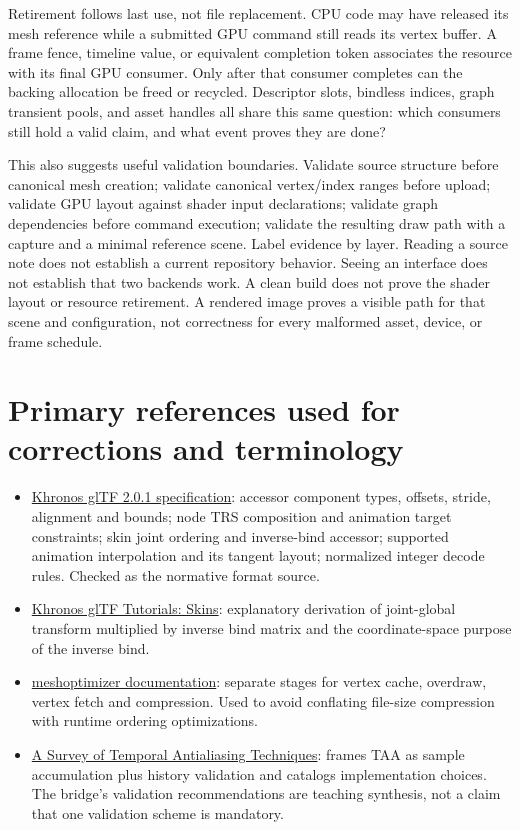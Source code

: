 Retirement follows last use, not file replacement. CPU code may have released its mesh reference while a submitted GPU command still reads its vertex buffer. A frame fence, timeline value, or equivalent completion token associates the resource with its final GPU consumer. Only after that consumer completes can the backing allocation be freed or recycled. Descriptor slots, bindless indices, graph transient pools, and asset handles all share this same question: which consumers still hold a valid claim, and what event proves they are done?

This also suggests useful validation boundaries. Validate source structure before canonical mesh creation; validate canonical vertex/index ranges before upload; validate GPU layout against shader input declarations; validate graph dependencies before command execution; validate the resulting draw path with a capture and a minimal reference scene. Label evidence by layer. Reading a source note does not establish a current repository behavior. Seeing an interface does not establish that two backends work. A clean build does not prove the shader layout or resource retirement. A rendered image proves a visible path for that scene and configuration, not correctness for every malformed asset, device, or frame schedule.

\section{Primary references used for corrections and terminology}\label{06-engine-ii-ch042-primary-references-used-for-corrections-and-terminology}

\begin{itemize}
\tightlist
\item
  \href{https://registry.khronos.org/glTF/specs/2.0/glTF-2.0.html}{Khronos glTF 2.0.1 specification}: accessor component types, offsets, stride, alignment and bounds; node TRS composition and animation target constraints; skin joint ordering and inverse-bind accessor; supported animation interpolation and its tangent layout; normalized integer decode rules. Checked as the normative format source.
\item
  \href{https://github.com/KhronosGroup/glTF-Tutorials/blob/main/gltfTutorial/gltfTutorial_020_Skins.md}{Khronos glTF Tutorials: Skins}: explanatory derivation of joint-global transform multiplied by inverse bind matrix and the coordinate-space purpose of the inverse bind.
\item
  \href{https://meshoptimizer.org/}{meshoptimizer documentation}: separate stages for vertex cache, overdraw, vertex fetch and compression. Used to avoid conflating file-size compression with runtime ordering optimizations.
\item
  \href{https://diglib.eg.org/items/cfa6a05c-53b3-4ee1-979d-48abc6225f6b}{A Survey of Temporal Antialiasing Techniques}: frames TAA as sample accumulation plus history validation and catalogs implementation choices. The bridge's validation recommendations are teaching synthesis, not a claim that one validation scheme is mandatory.
\end{itemize}

